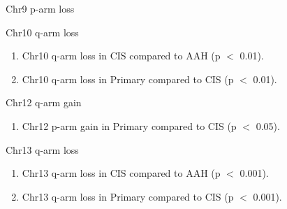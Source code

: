 \documentclass{beamer}
\begin{document}
\begin{frame}[allowframebreaks]
\begin{block}{Chr9 p-arm loss}
                    \begin{table}
                        \caption{CGC Tier1 genes in Chr9 p-arm}
                        \resizebox{\linewidth}{!}
                        {}
                    \end{table}
                \end{block}

                \begin{block}{Chr10 q-arm loss}
                    \begin{enumerate}
                        \item Chr10 q-arm loss in CIS compared to AAH (p $<$ 0.01).
                        \item Chr10 q-arm loss in Primary compared to CIS (p $<$ 0.01).
                    \end{enumerate}

                    \begin{table}
                        \caption{CGC Tier1 genes in Chr10 q-arm}
                        \resizebox{\linewidth}{!}
                        {}
                    \end{table}
                \end{block}

                \begin{block}{Chr12 q-arm gain}
                    \begin{enumerate}
                        \item Chr12 p-arm gain in Primary compared to CIS (p $<$ 0.05).
                    \end{enumerate}

                    \begin{table}
                        \caption{CGC Tier1 genes in Chr12 p-arm}
                        \resizebox{\linewidth}{!}
                        {}
                    \end{table}
                \end{block}

                \begin{block}{Chr13 q-arm loss}
                    \begin{enumerate}
                        \item Chr13 q-arm loss in CIS compared to AAH (p $<$ 0.001).
                        \item Chr13 q-arm loss in Primary compared to CIS (p $<$ 0.001).
                    \end{enumerate}


\end{block}
\end{frame}
\end{document}
